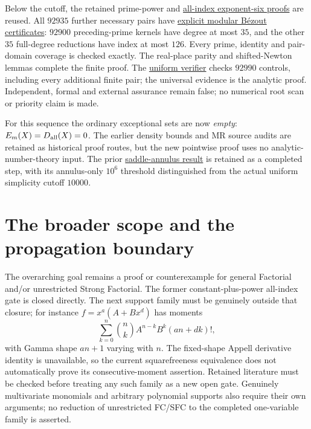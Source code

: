 \documentclass[11pt]{article}
\begin{document}
Below the cutoff, the retained prime-power and
\href{EFFECTIVE_EXPONENT_SIX_SIMPLICITY.tex}{all-index exponent-six proofs}
are reused. All $92935$ further necessary pairs have
\href{all_exponent_prefix_certificates.json}{explicit modular B\'ezout certificates}:
$92900$ preceding-prime kernels have degree at most $35$, and the other
$35$ full-degree reductions have index at most $126$. Every prime,
identity and pair-domain coverage is checked exactly. The real-place
parity and shifted-Newton lemmas complete the finite proof.
The \href{uniform_two_term_sfc_verification.json}{uniform verifier}
checks $92990$ controls, including every additional finite pair; the
universal evidence is the analytic proof. Independent, formal and external
assurance remain false; no numerical root scan or priority claim is made.

For this sequence the ordinary exceptional sets are now \emph{empty}:
$E_m(X)=D_{\rm all}(X)=0$. The earlier density bounds and MR source audits
are retained as historical proof routes, but the new pointwise proof uses
no analytic-number-theory input. The prior
\href{EFFECTIVE_SADDLE_ANNULUS.tex}{saddle-annulus result} is retained as a
completed step, with its annulus-only $10^6$ threshold distinguished from
the actual uniform simplicity cutoff $10000$.

\section*{The broader scope and the propagation boundary}
The overarching goal remains a proof or counterexample for general
Factorial and/or unrestricted Strong Factorial. The former
constant-plus-power all-index gate is closed directly. The next support
family must be genuinely outside that closure; for instance
$f=x^a(A+Bx^d)$ has moments
\[
 \sum_{k=0}^n\binom nk A^{n-k}B^k(an+dk)!,
\]
with Gamma shape $an+1$ varying with $n$. The fixed-shape Appell derivative
identity is unavailable, so the current squarefreeness equivalence does
not automatically prove its consecutive-moment assertion. Retained
literature must be checked before treating any such family as a new open gate.
Genuinely multivariate monomials and arbitrary polynomial supports also
require their own arguments; no reduction of unrestricted FC/SFC to the
completed one-variable family is asserted.
\end{document}
